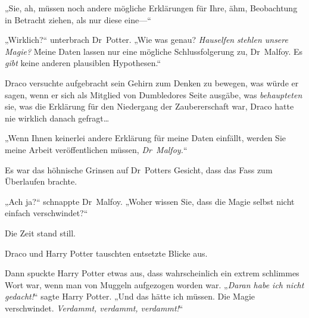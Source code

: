 „Sie, ah, müssen noch andere mögliche Erklärungen für Ihre, ähm, Beobachtung in Betracht ziehen, als nur diese eine—“

„Wirklich?“ unterbrach Dr~Potter. „Wie was genau? \emph{Hauselfen} \emph{stehlen unsere Magie?} Meine Daten lassen nur eine mögliche Schlussfolgerung zu, Dr~Malfoy. Es \emph{gibt} keine anderen plausiblen Hypothesen.“

Draco versuchte aufgebracht sein Gehirn zum Denken zu bewegen, was würde er sagen, wenn er sich als Mitglied von Dumbledores Seite ausgäbe, was \emph{behaupteten} sie, was die Erklärung für den Niedergang der Zaubererschaft war, Draco hatte nie wirklich danach gefragt…

„Wenn Ihnen keinerlei andere Erklärung für meine Daten einfällt, werden Sie meine Arbeit veröffentlichen müssen, \emph{Dr~Malfoy.}“

Es war das höhnische Grinsen auf Dr~Potters Gesicht, dass das Fass zum Überlaufen brachte.

„Ach ja?“ schnappte Dr~Malfoy. „Woher wissen Sie, dass die Magie selbst nicht einfach verschwindet?“

Die Zeit stand still.

Draco und Harry Potter tauschten entsetzte Blicke aus.

Dann spuckte Harry Potter etwas aus, dass wahrscheinlich ein extrem schlimmes Wort war, wenn man von Muggeln aufgezogen worden war. „\emph{Daran habe ich nicht gedacht!}“ sagte Harry Potter. „Und das hätte ich müssen. Die Magie verschwindet. \emph{Verdammt, verdammt, verdammt!}“

